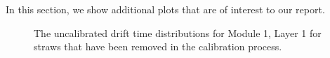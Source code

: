 \documentclass[a4paper]{report}
\numberwithin{equation}{section}
\begin{document}
In this section, we show additional plots that are of interest to our report.\par 

\begin{figure}[htb!]
	\centering
	\quad
	\centering
	\quad
	\centering
	\quad
	\centering
	\caption{The uncalibrated drift time distributions for Module 1, Layer 1 for straws that have been removed 
	in the calibration process.}
	\label{fig:calib_drift_straws}
\end{figure}
\end{document}

